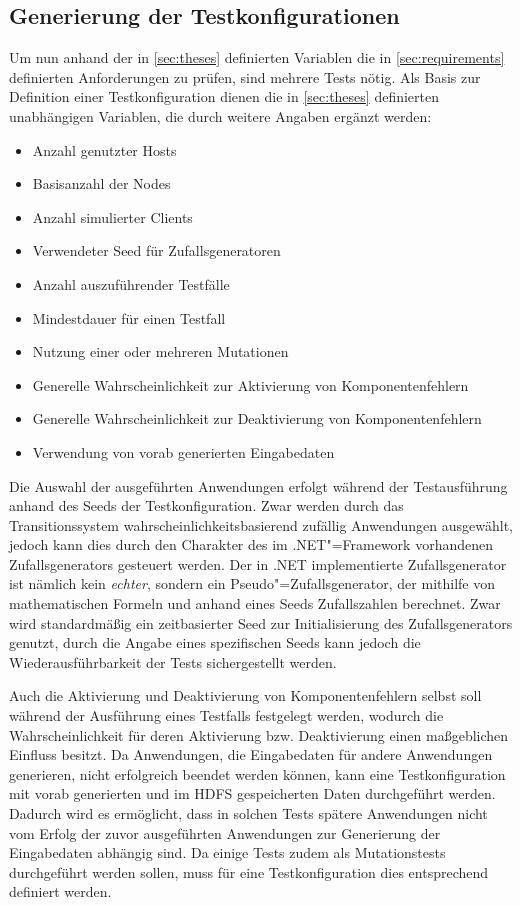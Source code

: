 \subsection{Generierung der Testkonfigurationen}
\label{sec:testcaseGeneration}

Um nun anhand der in \autoref{sec:theses} definierten Variablen die in \autoref{sec:requirements} definierten Anforderungen zu prüfen, sind mehrere Tests nötig.
Als Basis zur Definition einer Testkonfiguration dienen die in \autoref{sec:theses} definierten unabhängigen Variablen, die durch weitere Angaben ergänzt werden:

\begin{itemize}
    \item Anzahl genutzter Hosts
    \item Basisanzahl der Nodes
    \item Anzahl simulierter Clients
    \item Verwendeter Seed für Zufallsgeneratoren
    \item Anzahl auszuführender Testfälle
    \item Mindestdauer für einen Testfall
    \item Nutzung einer oder mehreren Mutationen
    \item Generelle Wahrscheinlichkeit zur Aktivierung von Komponentenfehlern
    \item Generelle Wahrscheinlichkeit zur Deaktivierung von Komponentenfehlern
    \item Verwendung von vorab generierten Eingabedaten
\end{itemize}

Die Auswahl der ausgeführten Anwendungen erfolgt während der Testausführung anhand des Seeds der Testkonfiguration.
Zwar werden durch das Transitionssystem wahrscheinlichkeitsbasierend zufällig Anwendungen ausgewählt, jedoch kann dies durch den Charakter des im .NET"=Framework vorhandenen Zufallsgenerators gesteuert werden.
Der in .NET implementierte Zufallsgenerator ist nämlich kein \emph{echter}, sondern ein Pseudo"=Zufallsgenerator, der mithilfe von mathematischen Formeln und anhand eines Seeds Zufallszahlen berechnet.
Zwar wird standardmäßig ein zeitbasierter Seed zur Initialisierung des Zufallsgenerators genutzt, durch die Angabe eines spezifischen Seeds kann jedoch die Wiederausführbarkeit der Tests sichergestellt werden.

Auch die Aktivierung und Deaktivierung von Komponentenfehlern selbst soll während der Ausführung eines Testfalls festgelegt werden, wodurch die Wahrscheinlichkeit für deren Aktivierung bzw. Deaktivierung einen maßgeblichen Einfluss besitzt.
Da Anwendungen, die Eingabedaten für andere Anwendungen generieren, \uU nicht erfolgreich beendet werden können, kann eine Testkonfiguration mit vorab generierten und im \ac{HDFS} gespeicherten Daten durchgeführt werden.
Dadurch wird es ermöglicht, dass in solchen Tests spätere Anwendungen nicht vom Erfolg der zuvor ausgeführten Anwendungen zur Generierung der Eingabedaten abhängig sind.
Da einige Tests zudem als Mutationstests durchgeführt werden sollen, muss für eine Testkonfiguration dies entsprechend definiert werden.

